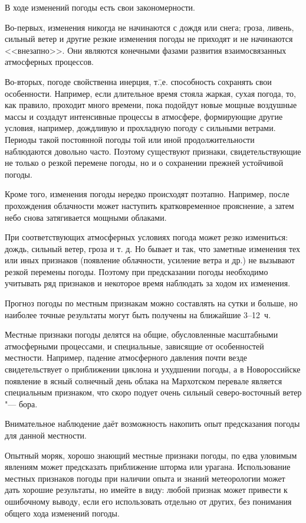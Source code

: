 В ходе изменений погоды есть свои закономерности.

Во-первых, изменения никогда не начинаются с дождя или снега; гроза,
ливень, сильный ветер и другие резкие изменения погоды не приходят и
не начинаются <<внезапно>>. Они являются конечными фазами развития
взаимосвязанных атмосферных процессов.

Во-вторых, погоде свойственна инерция, т.\=,е. способность сохранять
свои особенности. Например, если длительное время стояла жаркая, сухая
погода, то, как правило, проходит много времени, пока подойдут новые
мощные воздушные массы и создадут интенсивные процессы в атмосфере,
формирующие другие условия, например, дождливую и прохладную погоду с
сильными ветрами. Периоды такой постоянной погоды той или иной
продолжительности наблюдаются довольно часто. Поэтому существуют
признаки, свидетельствующие не только о резкой перемене погоды, но и о
сохранении прежней устойчивой погоды.

Кроме того, изменения погоды нередко происходят поэтапно. Например,
после прохождения облачности может наступить кратковременное
прояснение, а затем небо снова затягивается мощными облаками.

При соответствующих атмосферных условиях погода может резко
измениться: дождь, сильный ветер, гроза и т. д. Но бывает и так, что
заметные изменения тех или иных признаков (появление облачности,
усиление ветра и др.) не вызывают резкой перемены погоды. Поэтому при
предсказании погоды необходимо учитывать ряд признаков и некоторое
время наблюдать за ходом их изменения.

Прогноз погоды по местным признакам можно составлять на сутки и
больше, но наиболее точные результаты могут быть получены на ближайшие
3--12~ч.

Местные признаки погоды делятся на общие, обусловленные масштабными
атмосферными процессами, и специальные, зависящие от особенностей
местности. Например, падение атмосферного давления почти везде
свидетельствует о приближении циклона и ухудшении погоды, а в
Новороссийске появление в ясный солнечный день облака на Мархотском
перевале является специальным признаком, что скоро подует очень
сильный северо-восточный ветер "--- бора.

Внимательное наблюдение даёт возможность накопить опыт предсказания
погоды для данной местности.

Опытный моряк, хорошо знающий местные признаки погоды, по едва
уловимым явлениям может предсказать приближение шторма или
урагана. Использование местных признаков погоды при наличии опыта и
знаний метеорологии может дать хорошие результаты, но имейте в виду:
любой признак может привести к ошибочному выводу, если его
использовать отдельно от других, без понимания общего хода изменений
погоды.

